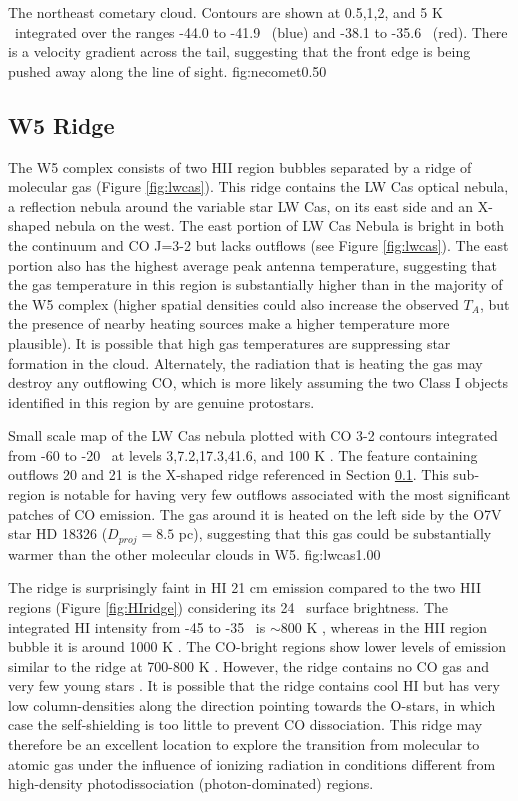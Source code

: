 {The northeast cometary cloud.  Contours are shown at 0.5,1,2, and 5 K \kms\
integrated over the ranges -44.0 to -41.9 \kms\ (blue) and -38.1 to -35.6 \kms\
(red).  There is a velocity gradient across the tail, suggesting that the front
edge is being pushed away along the line of sight.}
{fig:necomet}{0.5}{0}

\subsection{W5 Ridge}
\label{sec:w5ridge}
The W5 complex consists of two HII region bubbles separated by a ridge of
molecular gas (Figure \ref{fig:lwcas}).  This ridge contains the LW Cas optical
nebula, a reflection nebula around the variable star LW Cas, on its east side
and an X-shaped nebula on the west.  The east portion of LW Cas Nebula is
bright in both the continuum and CO J=3-2 but lacks outflows (see Figure
\ref{fig:lwcas}).  The east portion also has the highest average peak antenna
temperature, suggesting that the gas temperature in this region is
substantially higher than in the majority of the W5 complex (higher spatial
densities could also increase the observed $T_A$, but the presence of nearby heating
sources make a higher temperature more plausible).  It is possible
that high gas temperatures are suppressing star formation in the cloud.
Alternately, the radiation that is heating the gas may destroy any outflowing
CO, which is more likely assuming the two Class I objects identified in this
region by \citet{koenig:clustered:2008} are genuine protostars.

\Figure{figures_chw5/LWCas_CO32on24UM} %
{Small scale map of the LW Cas nebula plotted with CO 3-2 contours integrated
from -60 to -20 \kms\ at levels 3,7.2,17.3,41.6, and 100 K \kms.  The feature containing outflows 20 and
21 is the X-shaped ridge referenced in Section \ref{sec:w5ridge}.  This
sub-region is notable for having very few outflows associated with the most
significant patches of CO emission.   The gas
around it is heated on the left side by the O7V star HD 18326 ($D_{proj}=8.5$
pc), suggesting that this gas could be substantially warmer than the other
molecular clouds in W5.
}{fig:lwcas}{1.0}{0}

The ridge is surprisingly faint in HI 21 cm emission compared to the two HII regions
(Figure \ref{fig:HIridge}) considering its 24 \um\ surface brightness.  The
integrated HI intensity from -45 to -35 \kms\ is $\sim800$ K \kms, whereas in
the HII region bubble it is around 1000 K \kms.  The CO-bright regions show
lower levels of emission similar to the ridge at 700-800 K \kms.  However, the
ridge contains no CO gas and very few young stars \citep[Figure 7 in
][]{koenig:clustered:2008}.  It is possible that the ridge contains cool HI but
has very low column-densities along the direction pointing towards the O-stars,
in which case the self-shielding is too little to prevent CO dissociation.
This ridge may therefore be an excellent location to explore the transition
from molecular to atomic gas under the influence of ionizing radiation in
conditions different from high-density photodissociation (photon-dominated)
regions.

